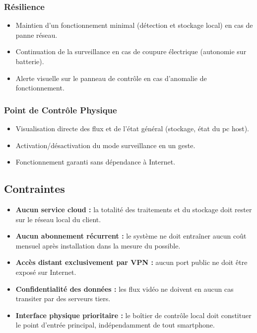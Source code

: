 \documentclass[12pt,a4paper]{article}
\begin{document}
\subsubsection{Résilience}
\begin{itemize}[label=•]
    \item Maintien d'un fonctionnement minimal (détection et stockage local) en cas de panne réseau.
    \item Continuation de la surveillance en cas de coupure électrique (autonomie sur batterie).
    \item Alerte visuelle sur le panneau de contrôle en cas d'anomalie de fonctionnement.
\end{itemize}

\subsubsection{Point de Contrôle Physique}
\begin{itemize}[label=•]
    \item Visualisation directe des flux et de l'état général (stockage, état du pc host).
    \item Activation/désactivation du mode surveillance en un geste.
    \item Fonctionnement garanti sans dépendance à Internet.
\end{itemize}

\subsection{Contraintes}

\begin{itemize}[label=•]
    \item \textbf{Aucun service cloud :} la totalité des traitements et du stockage doit rester sur le réseau local du client.
    \item \textbf{Aucun abonnement récurrent :} le système ne doit entraîner aucun coût mensuel après installation dans la mesure du possible.
    \item \textbf{Accès distant exclusivement par VPN :} aucun port public ne doit être exposé sur Internet.
    \item \textbf{Confidentialité des données :} les flux vidéo ne doivent en aucun cas transiter par des serveurs tiers.
    \item \textbf{Interface physique prioritaire :} le boîtier de contrôle local doit constituer le point d'entrée principal, indépendamment de tout smartphone.
\end{itemize}
\end{document}
